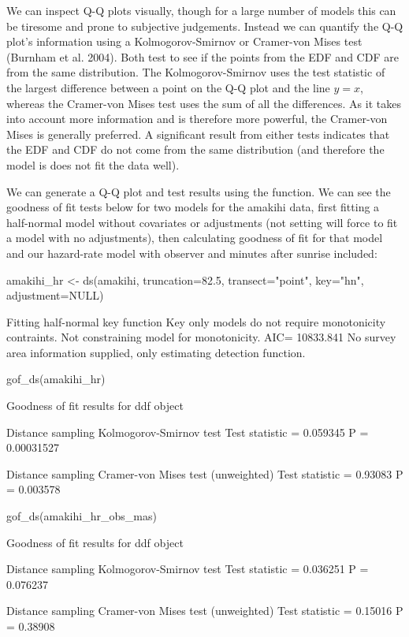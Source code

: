 \documentclass[article]{jss}
\begin{document}
We can inspect Q-Q plots visually, though for a large number of models
this can be tiresome and prone to subjective judgements. Instead we can
quantify the Q-Q plot's information using a Kolmogorov-Smirnov or
Cramer-von Mises test (Burnham et al. 2004). Both test to see if the
points from the EDF and CDF are from the same distribution. The
Kolmogorov-Smirnov uses the test statistic of the largest difference
between a point on the Q-Q plot and the line \(y=x\), whereas the
Cramer-von Mises test uses the sum of all the differences. As it takes
into account more information and is therefore more powerful, the
Cramer-von Mises is generally preferred. A significant result from
either tests indicates that the EDF and CDF do not come from the same
distribution (and therefore the model is does not fit the data well).

We can generate a Q-Q plot and test results using the 
function. We can see the goodness of fit tests below for two models for
the amakihi data, first fitting a half-normal model without covariates
or adjustments (not setting  will force 
to fit a model with no adjustments), then calculating goodness of fit
for that model and our hazard-rate model with observer and minutes after
sunrise included:

\begin{CodeChunk}
\begin{CodeInput}
amakihi_hr <- ds(amakihi, truncation=82.5, transect="point", key="hn", adjustment=NULL)
\end{CodeInput}
\begin{CodeOutput}
Fitting half-normal key function
Key only models do not require monotonicity contraints. Not constraining model for monotonicity.
AIC= 10833.841
No survey area information supplied, only estimating detection function.
\end{CodeOutput}
\begin{CodeInput}
gof_ds(amakihi_hr)
\end{CodeInput}
\begin{CodeOutput}

Goodness of fit results for ddf object

Distance sampling Kolmogorov-Smirnov test
Test statistic =  0.059345  P =  0.00031527 

Distance sampling Cramer-von Mises test (unweighted)
Test statistic =  0.93083  P =  0.003578 
\end{CodeOutput}
\begin{CodeInput}
gof_ds(amakihi_hr_obs_mas)
\end{CodeInput}
\begin{CodeOutput}

Goodness of fit results for ddf object

Distance sampling Kolmogorov-Smirnov test
Test statistic =  0.036251  P =  0.076237 

Distance sampling Cramer-von Mises test (unweighted)
Test statistic =  0.15016  P =  0.38908 
\end{CodeOutput}
\end{CodeChunk}
\end{document}
